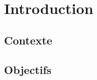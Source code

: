 \chapter{Introduction}
\label{chap:introduction}

\section{Contexte}

\lipsum[1]

\section{Objectifs}

\lipsum[1]
